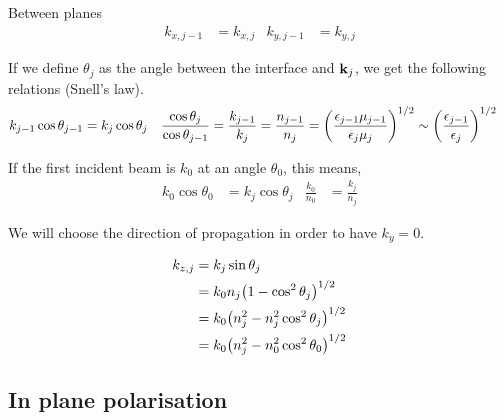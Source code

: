 Between planes
\begin{align*}
	k_{x,j-1} & = k_{x,j} & k_{y,j-1} & = k_{y,j}
\end{align*}

If we define $\theta_j$ as the angle between the interface and $\vb{k}_j$, we get the following relations (Snell's law).
\begin{align*}
	k_{j-1}\cos\theta_{j-1} & = k_{j}\cos\theta_{j} & \frac{\cos\theta_j}{\cos\theta_{j-1}} & = \frac{k_{j-1}}{k_j} = \frac{n_{j-1}}{n_j} = \pqty{\frac{\epsilon_{j-1}\mu_{j-1}}{\epsilon_j\mu_j}}^{1/2} \sim \pqty{\frac{\epsilon_{j-1}}{\epsilon_j}}^{1/2}
\end{align*}

If the first incident beam is $k_0$ at an angle $\theta_0$, this means,
\begin{align*}
	k_{0}\cos\theta_{0} & = k_{j}\cos\theta_{j} & \frac{k_0}{n_0} & = \frac{k_j}{n_j}
\end{align*}

We will choose the direction of propagation in order to have $k_y = 0$.

\begin{align*}
	k_{z,j} & = k_j \sin\theta_j                             \\
	        & = k_0 n_j \pqty{1 - \cos^2\theta_j}^{1/2}      \\
	        & = k_0 \pqty{n_j^2 - n_j^2\cos^2\theta_j}^{1/2} \\
	        & = k_0 \pqty{n_j^2 - n_0^2\cos^2\theta_0}^{1/2}
\end{align*}



\subsection{In plane polarisation} %
\label{sub:in_plane_polarisation}

